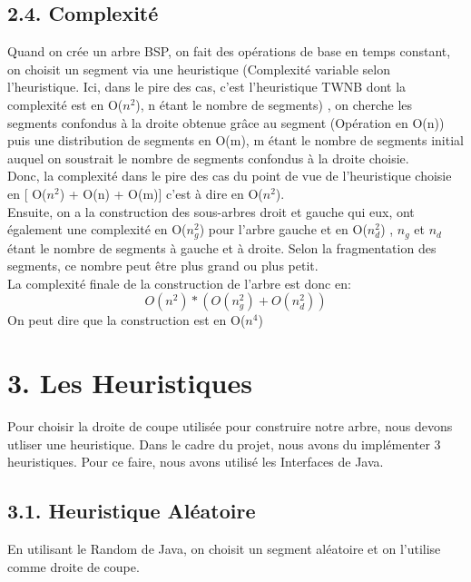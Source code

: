 \documentclass[a4paper,12pt]{report}	%
\begin{document}
    {\subsection*{2.4. Complexité}}
    Quand on crée un arbre BSP, on fait des opérations de base en temps constant, on choisit un segment via une heuristique (Complexité variable selon l'heuristique. Ici, dans le pire des cas, c'est l'heuristique TWNB dont la complexité est en O($n^2$), n étant le nombre de segments) , on cherche les segments confondus à la droite obtenue grâce au segment (Opération en O(n)) puis une distribution de segments en O(m), m étant le nombre de segments initial auquel on soustrait le nombre de segments confondus à la droite choisie.\\    
\indent Donc, la complexité dans le pire des cas du point de vue de l'heuristique choisie en [ O($n^2$) + O(n) + O(m)] c'est à dire en O($n^2$).\\
\indent Ensuite, on a la construction des sous-arbres droit et gauche qui eux, ont également une complexité en O($n_{g}^2$) pour l'arbre gauche et en O($n_{d}^2$) , $n_{g}$ et $n_{d}$ étant le nombre de segments à gauche et à droite. Selon la fragmentation des segments, ce nombre peut être plus grand ou plus petit.\\
\indent La complexité finale de la construction de l'arbre est donc en:
    \begin{equation}
    O(n^2) * (O(n_{g}^2) + O(n_{d}^2))
    \end{equation}
\indent On peut dire que la construction est en O($n^4$)\\

    
    \newpage
    
    {\section*{3. Les Heuristiques}}
      Pour choisir la droite de coupe utilisée pour construire notre arbre, nous devons utliser une heuristique. Dans le cadre du projet, nous avons du implémenter 3 heuristiques. Pour ce faire, nous avons utilisé les Interfaces de Java.\\
    
    {\subsection*{3.1. Heuristique Aléatoire}}
    En utilisant le Random de Java, on choisit un segment aléatoire et on l'utilise comme droite de coupe. \\
    
\end{document}
